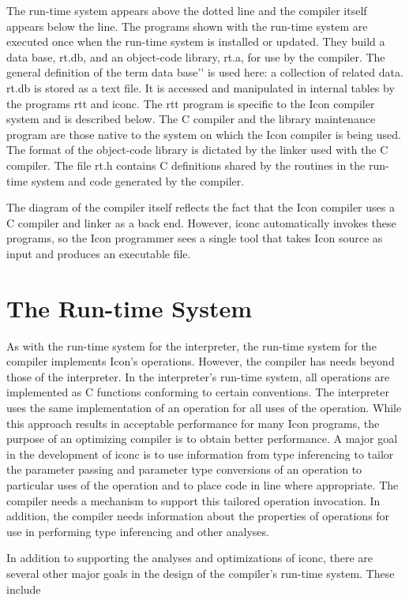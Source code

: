 The run-time system appears above the dotted line and the compiler
itself appears below the line. The programs shown with the run-time
system are executed once when the run-time system is installed or
updated. They build a data base, rt.db, and an object-code library,
rt.a, for use by the compiler. The general definition of the term
{\textasciigrave}{\textasciigrave}data base'{}' is used here: a
collection of related data. rt.db is stored as a text file. It is
accessed and manipulated in internal tables by the programs rtt and
iconc. The rtt program is specific to the Icon compiler system and is
described below. The C compiler and the library maintenance program
are those native to the system on which the Icon compiler is being
used. The format of the object-code library is dictated by the linker
used with the C compiler. The file rt.h contains C definitions shared
by the routines in the run-time system and code generated by the
compiler.

The diagram of the compiler itself reflects the fact that the Icon
compiler uses a C compiler and linker as a back end.  However, iconc
automatically invokes these programs, so the Icon programmer sees a
single tool that takes Icon source as input and produces an executable
file.


\section{The Run-time System}

As with the run-time system for the interpreter, the run-time system
for the compiler implements Icon's operations.  However, the compiler
has needs beyond those of the interpreter. In the interpreter's
run-time system, all operations are implemented as C functions
conforming to certain conventions. The interpreter uses the same
implementation of an operation for all uses of the operation. While
this approach results in acceptable performance for many Icon
programs, the purpose of an optimizing compiler is to obtain better
performance. A major goal in the development of iconc is to use
information from type inferencing to tailor the parameter passing and
parameter type conversions of an operation to particular uses of the
operation and to place code in line where appropriate. The compiler
needs a mechanism to support this tailored operation invocation. In
addition, the compiler needs information about the properties of
operations for use in performing type inferencing and other analyses.

In addition to supporting the analyses and optimizations of iconc,
there are several other major goals in the design of the compiler's
run-time system. These include

